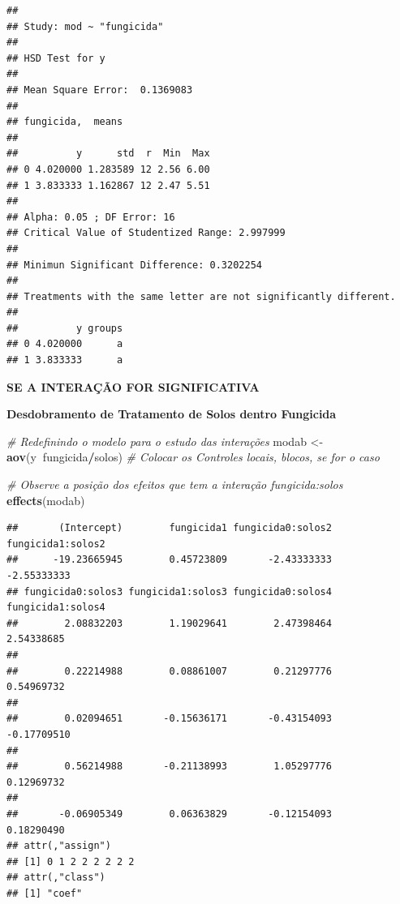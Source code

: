 \documentclass[
]{book}
\newenvironment{Shaded}{\begin{snugshade}}{\end{snugshade}}
\newcommand{\CommentTok}[1]{\textcolor[rgb]{0.56,0.35,0.01}{\textit{#1}}}
\newcommand{\KeywordTok}[1]{\textcolor[rgb]{0.13,0.29,0.53}{\textbf{#1}}}
\newcommand{\NormalTok}[1]{#1}
\newcommand{\OperatorTok}[1]{\textcolor[rgb]{0.81,0.36,0.00}{\textbf{#1}}}
\newcommand{\StringTok}[1]{\textcolor[rgb]{0.31,0.60,0.02}{#1}}
\begin{document}
\begin{verbatim}
## 
## Study: mod ~ "fungicida"
## 
## HSD Test for y 
## 
## Mean Square Error:  0.1369083 
## 
## fungicida,  means
## 
##          y      std  r  Min  Max
## 0 4.020000 1.283589 12 2.56 6.00
## 1 3.833333 1.162867 12 2.47 5.51
## 
## Alpha: 0.05 ; DF Error: 16 
## Critical Value of Studentized Range: 2.997999 
## 
## Minimun Significant Difference: 0.3202254 
## 
## Treatments with the same letter are not significantly different.
## 
##          y groups
## 0 4.020000      a
## 1 3.833333      a
\end{verbatim}

\textbf{SE A INTERAÇÃO FOR SIGNIFICATIVA}

\textbf{Desdobramento de Tratamento de Solos dentro Fungicida}

\begin{Shaded}
\begin{Highlighting}[]
\CommentTok{# Redefinindo o modelo para o estudo das interações}
\NormalTok{modab <-}\StringTok{ }\KeywordTok{aov}\NormalTok{(y}\OperatorTok{~}\NormalTok{fungicida}\OperatorTok{/}\NormalTok{solos) }\CommentTok{# Colocar os Controles locais, blocos, se for o caso}

\CommentTok{# Observe a posição dos efeitos que tem a interação fungicida:solos}
\KeywordTok{effects}\NormalTok{(modab)}
\end{Highlighting}
\end{Shaded}

\begin{verbatim}
##       (Intercept)        fungicida1 fungicida0:solos2 fungicida1:solos2 
##      -19.23665945        0.45723809       -2.43333333       -2.55333333 
## fungicida0:solos3 fungicida1:solos3 fungicida0:solos4 fungicida1:solos4 
##        2.08832203        1.19029641        2.47398464        2.54338685 
##                                                                         
##        0.22214988        0.08861007        0.21297776        0.54969732 
##                                                                         
##        0.02094651       -0.15636171       -0.43154093       -0.17709510 
##                                                                         
##        0.56214988       -0.21138993        1.05297776        0.12969732 
##                                                                         
##       -0.06905349        0.06363829       -0.12154093        0.18290490 
## attr(,"assign")
## [1] 0 1 2 2 2 2 2 2
## attr(,"class")
## [1] "coef"
\end{verbatim}
\end{document}
